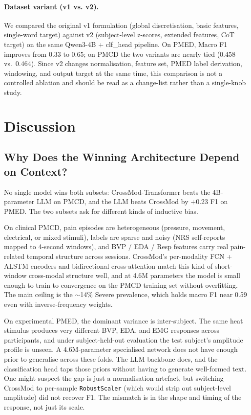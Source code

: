 \documentclass{article}
\begin{document}
\paragraph{Dataset variant (v1 vs. v2).} We compared the original v1 formulation (global discretisation, basic features, single-word target) against v2 (subject-level z-scores, extended features, CoT target) on the same Qwen3-4B + clf\_head pipeline. On PMED, Macro F1 improves from 0.33 to 0.65; on PMCD the two variants are nearly tied (0.458 vs.\ 0.464). Since v2 changes normalisation, feature set, PMED label derivation, windowing, and output target at the same time, this comparison is not a controlled ablation and should be read as a change-list rather than a single-knob study.

\section{Discussion}

\subsection{Why Does the Winning Architecture Depend on Context?}

No single model wins both subsets: CrossMod-Transformer beats the 4B-parameter LLM on PMCD, and the LLM beats CrossMod by $+0.23$ F1 on PMED. The two subsets ask for different kinds of inductive bias.

On clinical PMCD, pain episodes are heterogeneous (pressure, movement, electrical, or mixed stimuli), labels are sparse and noisy (NRS self-reports mapped to 4-second windows), and BVP / EDA / Resp features carry real pain-related temporal structure across sessions. CrossMod's per-modality FCN + ALSTM encoders and bidirectional cross-attention match this kind of short-window cross-modal structure well, and at 4.6M parameters the model is small enough to train to convergence on the PMCD training set without overfitting. The main ceiling is the $\sim$14\% Severe prevalence, which holds macro F1 near 0.59 even with inverse-frequency weights.

On experimental PMED, the dominant variance is inter-subject. The same heat stimulus produces very different BVP, EDA, and EMG responses across participants, and under subject-held-out evaluation the test subject's amplitude profile is unseen. A 4.6M-parameter specialised network does not have enough prior to generalise across these folds. The LLM backbone does, and the classification head taps those priors without having to generate well-formed text. One might suspect the gap is just a normalisation artefact, but switching CrossMod to per-sample \texttt{RobustScaler} (which would strip out subject-level amplitude) did not recover F1. The mismatch is in the shape and timing of the response, not just its scale.
\end{document}

